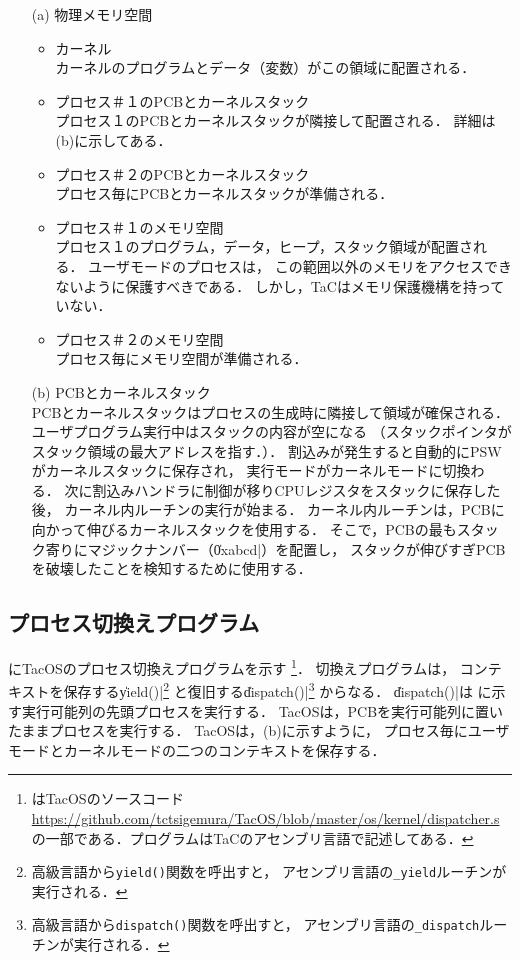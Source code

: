 \begin{enumerate}
\item[(a)] 物理メモリ空間

\begin{itemize}
\item カーネル \\
カーネルのプログラムとデータ（変数）がこの領域に配置される．

\item プロセス＃１のPCBとカーネルスタック \\
プロセス１のPCBとカーネルスタックが隣接して配置される．
詳細は(b)に示してある．

\item プロセス＃２のPCBとカーネルスタック \\
プロセス毎にPCBとカーネルスタックが準備される．

\item プロセス＃１のメモリ空間 \\
プロセス１のプログラム，データ，ヒープ，スタック領域が配置される．
ユーザモードのプロセスは，
この範囲以外のメモリをアクセスできないように保護すべきである．
しかし，TaCはメモリ保護機構を持っていない．

\item プロセス＃２のメモリ空間 \\
プロセス毎にメモリ空間が準備される．
\end{itemize}

\item[(b)] PCBとカーネルスタック \\
PCBとカーネルスタックはプロセスの生成時に隣接して領域が確保される．
ユーザプログラム実行中はスタックの内容が空になる
（スタックポインタがスタック領域の最大アドレスを指す．）．
割込みが発生すると自動的にPSWがカーネルスタックに保存され，
実行モードがカーネルモードに切換わる．
次に割込みハンドラに制御が移りCPUレジスタをスタックに保存した後，
カーネル内ルーチンの実行が始まる．
カーネル内ルーチンは，PCBに向かって伸びるカーネルスタックを使用する．
そこで，PCBの最もスタック寄りにマジックナンバー（\|0xabcd|）を配置し，
スタックが伸びすぎPCBを破壊したことを検知するために使用する．
\end{enumerate}

\subsection{プロセス切換えプログラム}
にTacOSのプロセス切換えプログラムを示す
\footnote{はTacOSのソースコード
\url{https://github.com/tctsigemura/TacOS/blob/master/os/kernel/dispatcher.s}
の一部である．プログラムはTaCのアセンブリ言語で記述してある．}．
切換えプログラムは，
コンテキストを保存する\|yield()|\footnote{
高級言語から{\tt yield()}関数を呼出すと，
アセンブリ言語の{\tt \_yield}ルーチンが実行される．}
と復旧する\|dispatch()|\footnote{
高級言語から{\tt dispatch()}関数を呼出すと，
アセンブリ言語の{\tt \_dispatch}ルーチンが実行される．}
からなる．
\|dispatch()|は
に示す実行可能列の先頭プロセスを実行する．
TacOSは，PCBを実行可能列に置いたままプロセスを実行する．
TacOSは，(b)に示すように，
プロセス毎にユーザモードとカーネルモードの二つのコンテキストを保存する．

